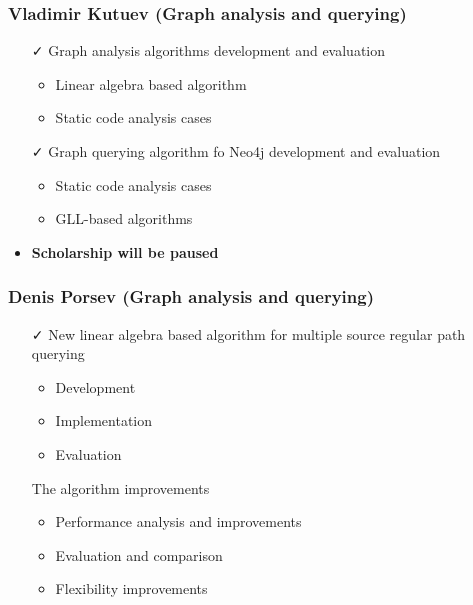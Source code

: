 \documentclass[xcolor=table,aspectratio=169]{beamer}
\begin{document}
\begin{frame}[fragile]
  \frametitle{Vladimir Kutuev (Graph analysis and querying)}
  \begin{minipage}[t]{0.48\textwidth}
    \begin{itemize}
      \item[\faCheck] Graph analysis algorithms development and evaluation
      \begin{itemize}
        \item Linear algebra based algorithm
        \item Static code analysis cases
      \end{itemize}
      \item[\faCheck] Graph querying algorithm fo Neo4j development and evaluation
      \begin{itemize}
        \item Static code analysis cases
        \item GLL-based algorithms
      \end{itemize}
    \end{itemize}
  \end{minipage}
  \pause
  \begin{minipage}[t]{0.48\textwidth}
    \begin{itemize}
      \item \textbf{Scholarship will be paused}
    \end{itemize}
  \end{minipage}
\end{frame}

\begin{frame}[fragile]
  \frametitle{Denis Porsev (Graph analysis and querying)}
  \begin{minipage}[t]{0.48\textwidth}
    \begin{itemize}
      \item[\faCheck] New linear algebra based algorithm for multiple source regular path querying
      \begin{itemize}
        \item Development
        \item Implementation
        \item Evaluation
      \end{itemize}      
    \end{itemize}
  \end{minipage}
  \pause
  \begin{minipage}[t]{0.48\textwidth}
    \begin{itemize}
      \item[\faHourglassHalf] The algorithm improvements
      \begin{itemize}
        \item Performance analysis and improvements
        \item Evaluation and comparison
        \item Flexibility improvements
      \end{itemize}      
    \end{itemize}
  \end{minipage}
\end{frame}
\end{document}
